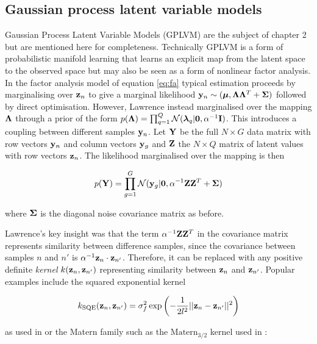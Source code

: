 \subsection{Gaussian process latent variable models} \label{sec:gplvm}

Gaussian Process Latent Variable Models (GPLVM) are the subject of chapter 2 but are mentioned here for completeness. Technically GPLVM is a form of probabilistic manifold learning that learns an explicit map from the latent space to the observed space but may also be seen as a form of nonlinear factor analysis. In the factor analysis model of equation \ref{eq:fa} typical estimation proceeds by marginalising over $\mathbf{z}_n$ to give a marginal likelihood $\mathbf{y}_n \sim(\bm{\mu}, \bm{\Lambda} \bm{\Lambda}^T + \bm{\Sigma})$ followed by direct optimisation. However, Lawrence \cite{lawrence2004gaussian} instead marginalised over the mapping $\bm{\Lambda}$ through a prior of the form $p(\bm{\Lambda}) = \prod_{q=1}^Q \mathcal{N}(\bm{\lambda}_q | \bm{0}, \alpha^{-1} \mathbf{I})$. This introduces a coupling between different samples $\mathbf{y}_n$. Let $\mathbf{Y}$ be the full $N \times G$ data matrix with row vectors $\mathbf{y}_n$ and column vectors $\mathbf{y}_g$ and $\mathbf{Z}$ the $N \times Q$
matrix of latent values with row vectors $\mathbf{z}_n$. The likelihood marginalised over the mapping is then

\begin{equation}
  p(\mathbf{Y}) = \prod_{g = 1}^G \mathcal{N}(\mathbf{y}_g | \bm{0}, \alpha^{-1} \mathbf{Z} \mathbf{Z}^T + \bm{\Sigma})
\end{equation}

where $\bm{\Sigma}$ is the diagonal noise covariance matrix as before.

Lawrence's key insight was that the term $\alpha^{-1} \mathbf{Z} \mathbf{Z}^T$ in the covariance matrix represents similarity between difference samples, since the covariance between samples $n$ and $n'$ is $\alpha^{-1} \mathbf{z}_n \cdot \mathbf{z}_{n'}$. Therefore, it can be replaced with any positive definite \emph{kernel} $k(\mathbf{z}_n, \mathbf{z}_{n'})$ representing similarity between $\mathbf{z}_n$ and $\mathbf{z}_{n'}$. Popular examples include the squared exponential kernel

\begin{equation}
k_{\text{SQE}}(\mathbf{z}_n, \mathbf{z}_{n'}) = \sigma_f^2 \exp\left(-\frac{1}{2l^2} \lvert \lvert \mathbf{z}_n - \mathbf{z}_{n'} \rvert\rvert^2\right)
\end{equation}

as used in \cite{campbell2016order} or the Matern family such as the $\text{Matern}_{3/2}$ kernel used in \cite{Reid2016-yo}:

